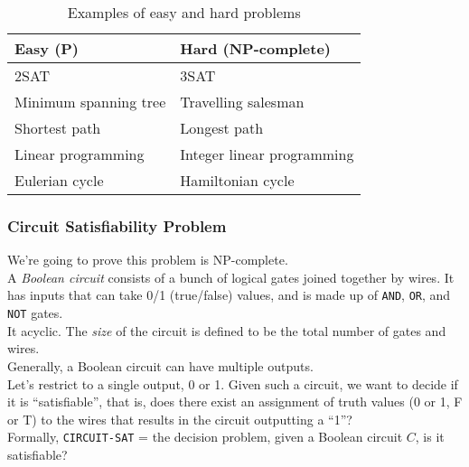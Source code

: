 \documentclass[12pt]{article}
\theoremstyle{plain}
\theoremstyle{definition}
\begin{document}
\begin{table}[H]
  \vspace{-15pt}
  \caption{Examples of easy and hard problems}
  \centering
  \begin{tabular}{| l | l |}
  \hline
  \textbf{Easy (P)} & \textbf{Hard (NP-complete)} \\ \hline \hline
  2SAT & 3SAT \\
  Minimum spanning tree & Travelling salesman \\
  Shortest path & Longest path \\
  Linear programming & Integer linear programming \\
  Eulerian cycle & Hamiltonian cycle \\
  \hline
  \end{tabular}
\end{table}

\subsubsection{Circuit Satisfiability Problem}
We're going to prove this problem is NP-complete. \\

A \emph{Boolean circuit} consists of a bunch of logical gates joined together by wires.
It has inputs that can take 0/1 (true/false) values, and is made up of \texttt{AND}, \texttt{OR}, and \texttt{NOT} gates. \\
It acyclic.
The \emph{size} of the circuit is defined to be the total number of gates and wires. \\
Generally, a Boolean circuit can have multiple outputs. \\
Let's restrict to a single output, 0 or 1.
Given such a circuit, we want to decide if it is ``satisfiable'', that is, does there exist an assignment of truth values (0 or 1, F or T) to the wires that results in the circuit outputting a ``1''? \\

Formally, \texttt{CIRCUIT-SAT} = the decision problem, given a Boolean circuit $C$, is it satisfiable?
\end{document}
